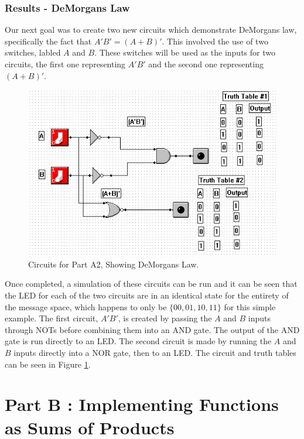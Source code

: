 \documentclass[a4paper,11pt]{article}
\begin{document}
\subsubsection{Results - DeMorgans Law} 
Our next goal was to create two new circuits which demonstrate DeMorgans law, specifically the fact that \(A'B' = (A+B)'\). This involved the use of two switches, labled $A$ and $B$. These switches will be used as the inputs for two circuits, the first one representing $A'B'$ and the second one representing $(A+B)'$.
\begin{figure}[h!]
   \centering
     \includegraphics[width=5in]{PartADM}
   \caption{Circuits for Part A2, Showing DeMorgans Law.}
   \label{fig:parta2}
\end{figure}  
Once completed, a simulation of these circuits can be run and it can be seen that the LED for each of the two circuits are in an identical state for the entirety of the message space, which happens to only be $ \lbrace 00, 01, 10, 11 \rbrace $ for this simple example. The first circuit, $A'B'$, is created by passing the $A$ and $B$ inputs through NOTs before combining them into an AND gate. The output of the AND gate is run directly to an LED. The second circuit is made by running the $A$ and $B$ inputs directly into a NOR gate, then to an LED. The circuit and truth tables can be seen in Figure \ref{fig:parta2}. \\





\section{Part B : Implementing Functions as Sums of Products}
\end{document}
